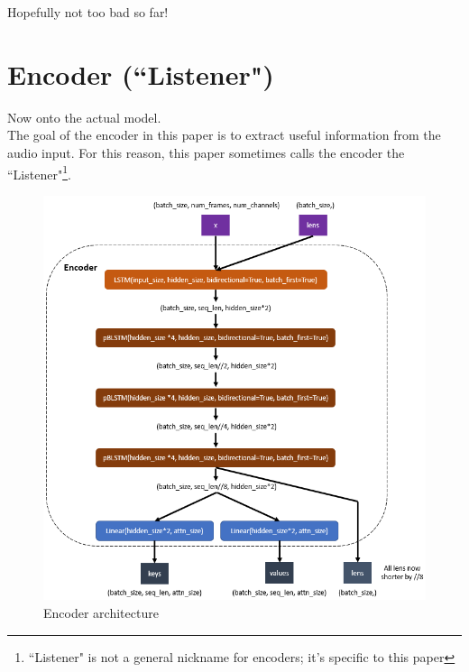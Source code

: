 \documentclass{article}
\newcommand{\ExternalLink}{%
    \tikz[x=1.2ex, y=1.2ex, baseline=-0.05ex]{%
        \begin{scope}[x=1ex, y=1ex]
            \clip (-0.1,-0.1) 
                --++ (-0, 1.2) 
                --++ (0.6, 0) 
                --++ (0, -0.6) 
                --++ (0.6, 0) 
                --++ (0, -1);
            \path[draw, 
                line width = 0.5, 
                rounded corners=0.5] 
                (0,0) rectangle (1,1);
        \end{scope}
        \path[draw, line width = 0.5] (0.5, 0.5) 
            -- (1, 1);
        \path[draw, line width = 0.5] (0.6, 1) 
            -- (1, 1) -- (1, 0.6);
        }
    }
\newcommand{\ttt}[1]{\texttt{#1}}
\begin{document}

Hopefully not too bad so far!


\newpage{}
\section{Encoder (``Listener")}

Now onto the actual model.\\

The goal of the encoder in this paper is to extract useful information from the audio input. For this reason, this paper sometimes calls the encoder the ``Listener"\footnote{``Listener" is not a general nickname for encoders; it's specific to this paper}. \\

\begin{figure}[h]
\centering
\includegraphics[scale=0.9]{images/encoder.png}
\caption{Encoder architecture}
\end{figure}
\end{document}
